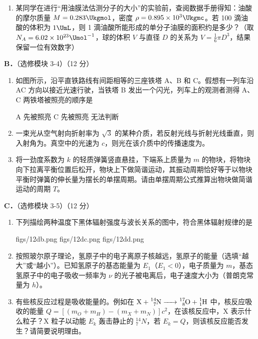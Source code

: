 \documentclass[\gkver]{gaokaozhenti}
\begin{document}
\begin{enumerate}
\begin{enumerate}
	\item
	某同学在进行“用油膜法估测分子的大小”的实验前，查阅数据手册得知：油酸的摩尔质量 $M=0.283\Ukgmol$，密度 $\rho=0.895\times10^{3}\Ukgmc$。若 100 滴油酸的体积为 $1\UmL$，则 1 滴油酸所能形成的单分子油膜的面积约是多少？（取 $N_{A}=6.02\times10^{23}\Umol^{-1}$，球的体积 $V$ 与直径 $D$ 的关系为 $V=\frac{1}{6}\pi D^{3}$，结果保留一位有效数字）
\end{enumerate}

\textbf{B．}（选修模块 3-4）（12 分）

\begin{enumerate}
	\item
	如图所示，沿平直铁路线有间距相等的三座铁塔 A、B 和 C。假想有一列车沿 AC 方向以接近光速行驶，当铁塔 B 发出一个闪光，列车上的观测者测得 A、C 两铁塔被照亮的顺序是

	\onepicture[w=3.46cm]{}

	{A 先被照亮}
	{C 先被照亮}
	{无法判断}
	\item
	一束光从空气射向折射率为 $\sqrt{3}$ 的某种介质，若反射光线与折射光线垂直，则入射角为。真空中的光速为 $c$，则光在该介质中的传播速度为。
	\item
	将一劲度系数为 $k$ 的轻质弹簧竖直悬挂，下端系上质量为 $m$ 的物块，将物块向下拉离平衡位置后松开，物块上下做简谐运动，其振动周期恰好等于以物块平衡时弹簧的伸长量为摆长的单摆周期。请由单摆周期公式推算出物块做简谐运动的周期 $T$。
\end{enumerate}

\textbf{C．}（选修模块 3-5）（12 分）

\begin{enumerate}
	\item
	下列描绘两种温度下黑体辐射强度与波长关系的图中，符合黑体辐射规律的是

	{figs/12db.png}
	{figs/12dc.png}
	{figs/12dd.png}
	\item
	按照玻尔原子理论，氢原子中的电子离原子核越远，氢原子的能量（选填“越大”或“越小”）。已知氢原子的基态能量为 $E_{1}$（$E_{1}<0$），电子质量为 $m$，基态氢原子中的电子吸收一频率为 $\nu$ 的光子被电离后，电子速度大小为（普朗克常量为 $h$）。
	\item
	有些核反应过程是吸收能量的。例如在 $\ce{X + ^{14}_{7}N -> ^{17}_{8}O + ^{1}_{1}H}$ 中，核反应吸收的能量 $Q=[(m_{O}+m_{H})-(m_{X}+m_{N})]c^{2}$，在该核反应中，X 表示什么粒子？X 粒子以动能 $E_{k}$ 轰击静止的 $^{14}_{7}N$，若 $E_{k}=Q$，则该核反应能否发生？请简要说明理由。
\end{enumerate}


\end{enumerate}
\end{document}
